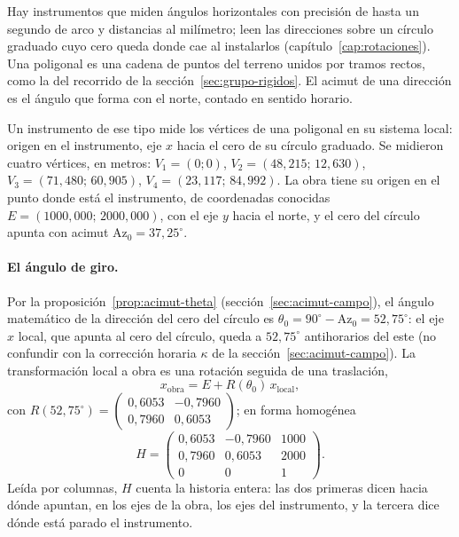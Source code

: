 \begin{idea}
Hay instrumentos que miden ángulos horizontales con precisión de hasta un segundo de arco y
distancias al milímetro; leen las direcciones sobre un círculo graduado cuyo cero queda donde
cae al instalarlos (capítulo~\ref{cap:rotaciones}). Una poligonal es una cadena de puntos del
terreno unidos por tramos rectos, como la del recorrido de la sección~\ref{sec:grupo-rigidos}.
El acimut de una dirección es el ángulo que forma con el norte, contado en sentido horario.
\end{idea}

Un instrumento de ese tipo mide los vértices de una poligonal en su sistema local: origen en el
instrumento, eje \(x\) hacia el cero de su círculo graduado. Se midieron cuatro vértices, en metros:
\(V_1=(0;0)\), \(V_2=(48{,}215;\,12{,}630)\), \(V_3=(71{,}480;\,60{,}905)\),
\(V_4=(23{,}117;\,84{,}992)\). La obra tiene su origen en el punto donde está el instrumento,
de coordenadas conocidas
\(E=(1000{,}000;\,2000{,}000)\), con el eje \(y\) hacia el norte, y el cero del círculo apunta con
acimut \(\mathrm{Az}_0=37{,}25^\circ\).

\paragraph{El ángulo de giro.} Por la proposición~\ref{prop:acimut-theta} (sección~\ref{sec:acimut-campo}),
el ángulo matemático de la dirección del cero del círculo es
\(\theta_0=90^\circ-\mathrm{Az}_0=52{,}75^\circ\): el eje \(x\) local, que apunta al cero del círculo,
queda a \(52{,}75^\circ\) antihorarios del este (no confundir con la corrección horaria
\(\kappa\) de la sección~\ref{sec:acimut-campo}). La transformación local a obra es una
rotación seguida de una traslación,
\[
x_{\text{obra}}=E+R(\theta_0)\,x_{\text{local}},
\]
con \(R(52{,}75^\circ)=\left(\begin{smallmatrix}0{,}6053&-0{,}7960\\0{,}7960&0{,}6053\end{smallmatrix}\right)\);
en forma homogénea
\[
H=\begin{pmatrix}0{,}6053&-0{,}7960&1000\\0{,}7960&0{,}6053&2000\\0&0&1\end{pmatrix}.
\]
Leída por columnas, \(H\) cuenta la historia entera: las dos primeras dicen hacia dónde
apuntan, en los ejes de la obra, los ejes del instrumento, y la tercera dice dónde está
parado el instrumento.

